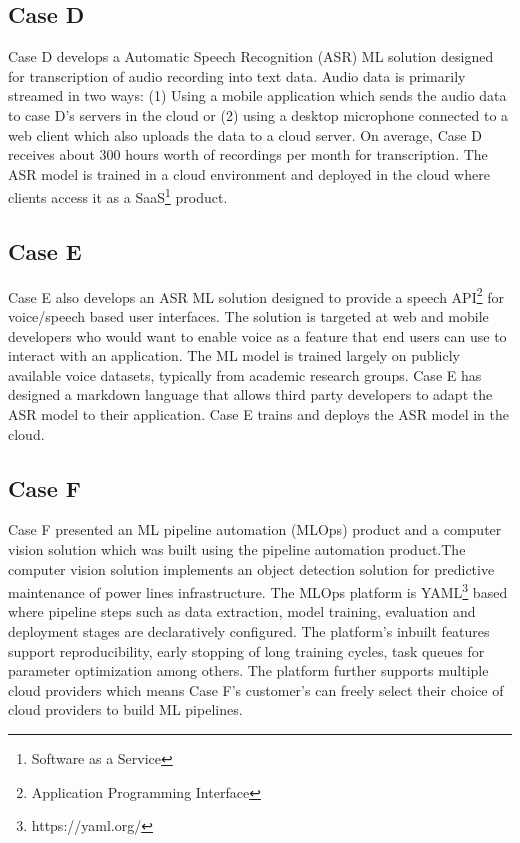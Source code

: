\subsection{Case D}
Case D develops a Automatic Speech Recognition (ASR) ML solution designed for transcription of audio recording into text data. Audio data is primarily streamed in two ways: (1) Using a mobile application which sends the audio data to case D's servers in the cloud  or (2) using a desktop microphone connected to a web client which also uploads the data to a cloud server. On average, Case D receives about 300 hours worth of recordings per month for transcription. The ASR model is trained in a cloud environment and deployed in the cloud where clients access it as a SaaS\footnote{Software as a Service} product.

\subsection{Case E}
Case E also develops an ASR ML solution designed to provide a speech API\footnote{Application Programming Interface} for voice/speech based user interfaces. The solution is targeted at web and mobile developers who would want to enable voice as a feature that end users can use to interact with an application. The ML model is trained largely on publicly available voice datasets, typically from academic research groups. Case E has designed a markdown language that allows third party developers to adapt the ASR model to their application. Case E trains and deploys the ASR model in the cloud. 

\subsection{Case F}
Case F presented an ML pipeline automation (MLOps) product and a computer vision solution which was built using the pipeline automation product.The computer vision solution implements an object detection solution for predictive maintenance of power lines infrastructure.
The MLOps platform is YAML\footnote{https://yaml.org/} based where  pipeline steps such as data extraction, model training, evaluation and deployment stages are declaratively configured. The platform's inbuilt features support reproducibility, early stopping of long training cycles, task queues for parameter optimization among others. The platform further supports multiple cloud providers which means Case F's customer's can freely select their choice of cloud providers to build ML pipelines.


